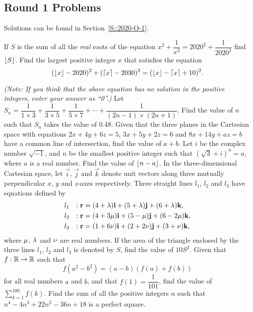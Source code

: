 \subsection{Round 1 Problems}

Solutions can be found in Section~\ref{S::2020-O-1}.

\begin{enumerate}
    \hyperrefitem[A::2020-O-1-1] If $S$ is the sum of all the \textit{real} roots of the equation $x^2 + \dfrac{1}{x^2} = 2020^2 + \dfrac{1}{2020^2}$ find $\left\lfloor S \right\rfloor$.
    \hyperrefitem[A::2020-O-1-2] Find the largest positive integer $x$ that satisfies the equation \[(\left\lfloor x \right\rfloor - 2020)^2 + (\left\lceil x \right\rceil - 2030)^2 = (\left\lfloor x \right\rfloor - \left\lceil x \right\rceil + 10)^2.\]

    \textit{(Note: If you think that the above equation has no solution in the positive integers, enter your answer as ``0''.)}
    \hyperrefitem[A::2020-O-1-3] Let $S_n = \dfrac1{1 \times 3} + \dfrac{1}{3 \times 5} + \dfrac1{5 \times 7} + \cdots + \dfrac{1}{(2n-1) \times (2n+1)}$. Find the value of $n$ such that $S_n$ takes the value of 0.48.
    \hyperrefitem[A::2020-O-1-4] Given that the three planes in the Cartesian space with equations $2x + 4y + 6z = 5$, $3x + 5y + 2z = 6$ and $8x + 14y + az = b$ have a common line of intersection, find the value of $a + b$.
    \hyperrefitem[A::2020-O-1-5] Let $i$ be the complex number $\sqrt{-1}$, and $n$ be the smallest positive integer such that $(\sqrt3 + i)^n = a$, where $a$ is a real number. Find the value of $\left\lfloor n-a \right\rfloor$.
    \hyperrefitem[A::2020-O-1-6] In the three-dimensional Cartesian space, let $\vec i$, $\vec j$ and $\vec k$ denote unit vectors along three mutually perpendicular $x$, $y$ and $z$-axes respectively. Three straight lines $l_1$, $l_2$ and $l_3$ have equations defined by
    \begin{alignat*}{2}
        l_1 && : \mathbf{r} &= (4 + \lambda)\mathbf{i} + (5 + \lambda)\mathbf{j} + (6 + \lambda)\mathbf{k},\\
        l_2 && : \mathbf{r} &= (4 + 3\mu)\mathbf{i} + (5 - \mu)\mathbf{j} + (6 - 2\mu) \mathbf{k},\\
        l_3 && : \mathbf{r} &= (1 + 6\nu)\mathbf{i} + (2 + 2\nu) \mathbf{j} + (3 + \nu) \mathbf{k},
    \end{alignat*}
    where $\mu$, $\lambda$ and $\nu$ are real numbers. If the area of the triangle enclosed by the three lines $l_1$, $l_2$ and $l_3$ is denoted by $S$, find the value of $10S^2$.
    \hyperrefitem[A::2020-O-1-7] Given that $f : \mathbb{R} \to \mathbb{R}$ such that \[f(a^2 - b^2) = (a-b)(f(a) + f(b))\] for all real numbers $a$ and $b$, and that $f(1) = \dfrac1{101}$, find the value of $\displaystyle\sum_{k=1}^{100} f(k)$.
    \hyperrefitem[A::2020-O-1-8] Find the sum of all the positive integers $n$ such that $n^4 - 4n^3 + 22n^2 - 36n + 18$ is a perfect square.


\end{enumerate}
